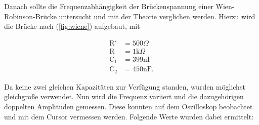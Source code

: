 \noindent
Danach sollte die Frequenzabhängigkeit der Brückenspannung einer Wien-Robinson-Brücke untersucht und mit der Theorie verglichen werden.
Hierzu wird die Brücke nach (\ref{fig:wiene}) aufgebaut, mit

\begin{align*}
\text{R}' &= 500\Omega\\
\text{R} &= 1\text{k}\Omega\\
\text{C}_1 &= 399 \si{\nano\farad}\\
\text{C}_2 &= 450 \si{\nano\farad}.
\end{align*}

\noindent
Da keine zwei gleichen Kapazitäten zur Verfügung standen, wurden möglichst gleichgroße verwendet.
Nun wird die Frequenz variiert und die dazugehörigen doppelten Amplituden gemessen.
Diese konnten auf dem Oszilloskop beobachtet und mit dem Cursor vermessen werden.
Folgende Werte wurden dabei ermittelt:


